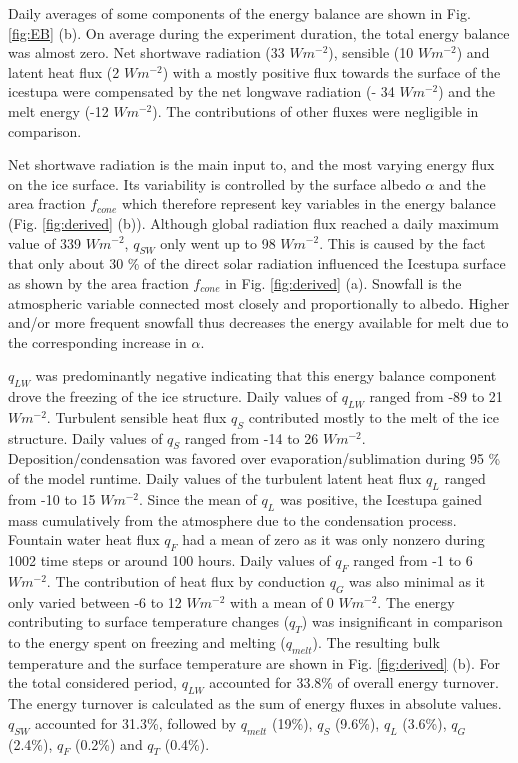 \documentclass[utf8]{frontiersSCNS} %
\begin{document}
Daily averages of some components of the energy balance are shown in Fig.  \ref{fig:EB} (b). On average during the
experiment duration, the total energy balance was almost zero. Net shortwave radiation (33 $Wm^{-2}$), sensible (10
$Wm^{-2}$) and latent heat flux (2 $Wm^{-2}$) with a mostly positive flux towards the surface of the icestupa were
compensated by the net longwave radiation (- 34 $Wm^{-2}$) and the melt energy (-12 $Wm^{-2}$). The contributions of
other fluxes were negligible in comparison.

Net shortwave radiation is the main input to, and the most varying energy flux on the ice surface. Its variability is
controlled by the surface albedo $\alpha$ and the area fraction $f_{cone}$ which therefore represent key variables in
the energy balance (Fig. \ref{fig:derived} (b)). Although global radiation flux reached a daily maximum value of 339
$Wm^{-2}$, $q_{SW}$ only went up to 98 $Wm^{-2}$. This is caused by the fact that only about 30 \% of the direct solar
radiation influenced the Icestupa surface as shown by the area fraction $f_{cone}$ in Fig. \ref{fig:derived} (a).
Snowfall is the atmospheric variable connected most closely and proportionally to albedo.  Higher and/or more frequent
snowfall thus decreases the energy available for melt due to the corresponding increase in $\alpha$. 

$q_{LW}$ was predominantly negative indicating that this energy balance component drove the freezing of the ice
structure. Daily values of $q_{LW}$ ranged from -89 to 21 $Wm^{-2}$.  Turbulent sensible heat flux $q_{S}$ contributed
mostly to the melt of the ice structure. Daily values of $q_{S}$ ranged from -14 to 26 $Wm^{-2}$.
Deposition/condensation was favored over evaporation/sublimation during 95 \% of the model runtime.  Daily values of the
turbulent latent heat flux $q_{L}$ ranged from -10 to 15 $Wm^{-2}$.  Since the mean of $q_{L}$ was positive, the
Icestupa gained mass cumulatively from the atmosphere due to the condensation process.  Fountain water heat flux $q_{F}$
had a mean of zero as it was only nonzero during 1002 time steps or around 100 hours.  Daily values of $q_{F}$ ranged
from -1 to 6 $Wm^{-2}$. The contribution of heat flux by conduction $q_{G}$ was also minimal as it only varied between
-6 to 12 $Wm^{-2}$ with a mean of 0 $Wm^{-2}$. The energy contributing to surface temperature changes ($q_{T}$) was
insignificant in comparison to the energy spent on freezing and melting ($q_{melt}$).  The resulting bulk temperature
and the surface temperature are shown in Fig. \ref{fig:derived} (b).  For the total considered period, $q_{LW}$
accounted for 33.8\% of overall energy turnover. The energy turnover is calculated as the sum of energy fluxes in
absolute values. $q_{SW}$ accounted for 31.3\%, followed by $q_{melt}$ (19\%), $q_{S}$ (9.6\%), $q_{L}$ (3.6\%), $q_{G}$
(2.4\%), $q_{F}$ (0.2\%) and $q_{T}$ (0.4\%).
\end{document}
